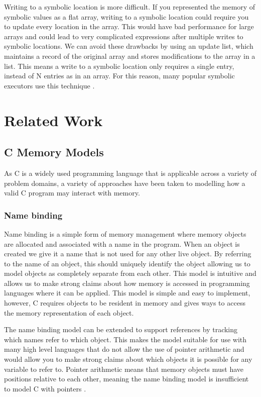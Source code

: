 \documentclass[12pt,twoside]{report}
\begin{document}
Writing to a symbolic location is more difficult. If you represented the memory of symbolic values as a flat array, writing to a symbolic location could require you to update every location in the array. This would have bad performance for large arrays and could lead to very complicated expressions after multiple writes to symbolic locations. We can avoid these drawbacks by using an update list, which maintains a record of the original array and stores modifications to the array in a list. This means a write to a symbolic location only requires a single entry, instead of N entries as in an array. For this reason, many popular symbolic executors use this technique \cite{cadar2008klee, cadar2008exe}.


\chapter{Related Work}
\section{C Memory Models}
As C is a widely used programming language that is applicable across a variety of problem domains, a variety of approaches have been taken to modelling how a valid C program may interact with memory.
\subsection{Name binding}
Name binding is a simple form of memory management where memory objects are allocated and associated with a name in the program. When an object is created we give it a name that is not used for any other live object. By referring to the name of an object, this should uniquely identify the object allowing us to model objects as completely separate from each other. This model is intuitive and allows us to make strong claims about how memory is accessed in programming languages where it can be applied.
This model is simple and easy to implement, however, C requires objects to be resident in memory and gives ways to access the memory representation of each object. 

The name binding model can be extended to support references by tracking which names refer to which object. This makes the model suitable for use with many high level languages that do not allow the use of pointer arithmetic and would allow you to make strong claims about which objects it is possible for any variable to refer to. Pointer arithmetic means that memory objects must have positions relative to each other, meaning the name binding model is insufficient to model C with pointers \cite{xu2010memory}.
\end{document}
